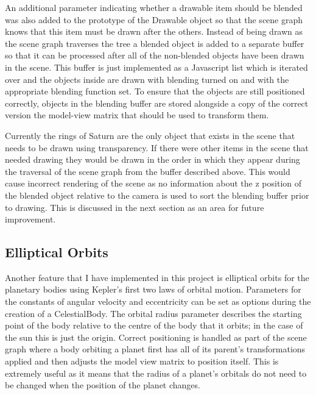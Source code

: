 \documentclass[paper=a4, fontsize=11pt]{scrartcl}	%
\numberwithin{equation}{section}															%
\numberwithin{figure}{section}																%
\numberwithin{table}{section}																%
\begin{document}
An additional parameter indicating whether a drawable item should be blended was also added to the prototype of the Drawable object so that the scene graph knows that this item must be drawn after the others. Instead of being drawn as the scene graph traverses the tree a blended object is added to a separate buffer so that it can be processed after all of the non-blended objects have been drawn in the scene. This buffer is just implemented as a Javascript list which is iterated over and the objects inside are drawn with blending turned on and with the appropriate blending function set. To ensure that the objects are still positioned correctly, objects in the blending buffer are stored alongside a copy of the correct version the model-view matrix that should be used to transform them.

Currently the rings of Saturn are the only object that exists in the scene that needs to be drawn using transparency. If there were other items in the scene that needed drawing they would be drawn in the order in which they appear during the traversal of the scene graph from the buffer described above. This would cause incorrect rendering of the scene as no information about the z position of the blended object relative to the camera is used to sort the blending buffer prior to drawing. This is discussed in the next section as an area for future improvement.

\subsection{Elliptical Orbits}
Another feature that I have implemented in this project is elliptical orbits for the planetary bodies using Kepler's first two laws of orbital motion. Parameters for the constants of angular velocity and eccentricity can be set as options during the creation of a CelestialBody. The orbital radius parameter describes the starting point of the body relative to the centre of the body that it orbits; in the case of the sun this is just the origin. Correct positioning is handled as part of the scene graph where a body orbiting a planet first has all of its parent's transformations applied and then adjusts the model view matrix to position itself. This is extremely useful as it means that the radius of a planet's orbitals do not need to be changed when the position of the planet changes.
\end{document}
